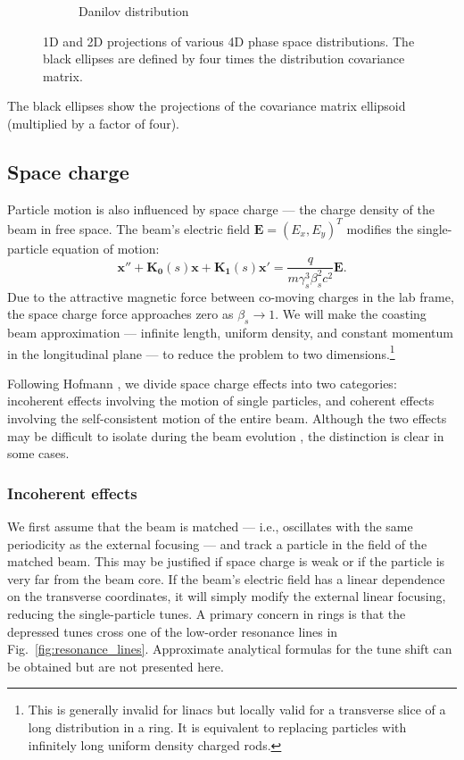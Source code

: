 \begin{figure}[!p]
\begin{subfigure}{0.49\textwidth}
        \caption{Danilov distribution}
        \label{fig:distributions_danilov}
    \end{subfigure}
    \caption{1D and 2D projections of various 4D phase space distributions. The black ellipses are defined by four times the distribution covariance matrix.}
    \label{fig:distributions}
\end{figure}
%
The black ellipses show the projections of the covariance matrix ellipsoid (multiplied by a factor of four).



\subsection{Space charge}\label{sec:Space charge}

Particle motion is also influenced by space charge — the charge density of the beam in free space. The beam's electric field $\mathbf{E} = (E_x, E_y)^T$ modifies the single-particle equation of motion:
%
\begin{equation}\label{eq:eom_with_spacecharge}
    \mathbf{x}'' + \mathbf{K_0}(s) \mathbf{x} + \mathbf{K_1}(s) \mathbf{x}' = \frac{q}{m\gamma_s^3\beta_s^2c^2} \mathbf{E}.
\end{equation}
% 
Due to the attractive magnetic force between co-moving charges in the lab frame, the space charge force approaches zero as $\beta_s \rightarrow 1$. We will make the coasting beam approximation — infinite length, uniform density, and constant momentum in the longitudinal plane — to reduce the problem to two dimensions.\footnote{This is generally invalid for linacs but locally valid for a transverse slice of a long distribution in a ring. It is equivalent to replacing particles with infinitely long uniform density charged rods.}

Following Hofmann \cite{Hofmann2017Book}, we divide space charge effects into two categories: incoherent effects involving the motion of single particles, and coherent effects involving the self-consistent motion of the entire beam. Although the two effects may be difficult to isolate during the beam evolution \cite{Hofmann2021}, the distinction is clear in some cases. 


\subsubsection{Incoherent effects}

We first assume that the beam is matched — i.e., oscillates with the same periodicity as the external focusing — and track a particle in the field of the matched beam. This may be justified if space charge is weak or if the particle is very far from the beam core. If the beam's electric field has a linear dependence on the transverse coordinates, it will simply modify the external linear focusing, reducing the single-particle tunes. A primary concern in rings is that the depressed tunes cross one of the low-order resonance lines in Fig.~\ref{fig:resonance_lines}. Approximate analytical formulas for the tune shift can be obtained \cite{Ng2005} but are not presented here. 

